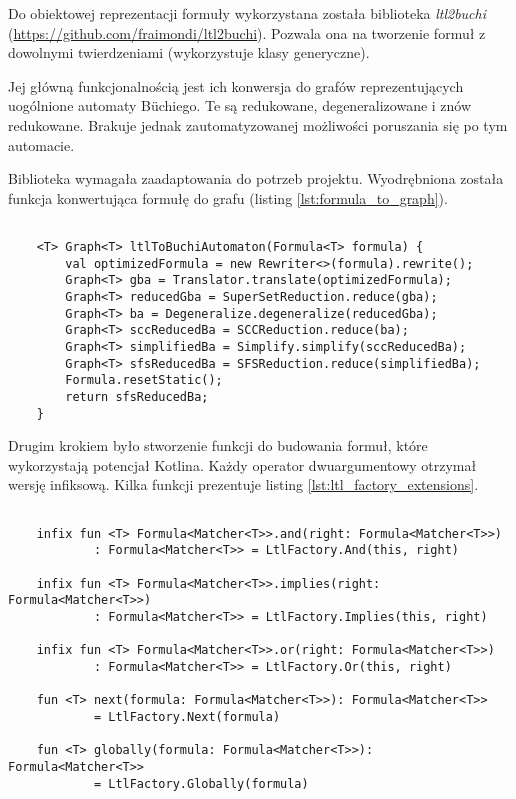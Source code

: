 Do obiektowej reprezentacji formuły wykorzystana została biblioteka \textit{ltl2buchi} \\(\url{https://github.com/fraimondi/ltl2buchi}).
Pozwala ona na tworzenie formuł z dowolnymi twierdzeniami (wykorzystuje klasy generyczne).

Jej główną funkcjonalnością jest ich konwersja do grafów reprezentujących uogólnione automaty Büchiego.
Te są redukowane, degeneralizowane i znów redukowane.
Brakuje jednak zautomatyzowanej możliwości poruszania się po tym automacie.

Biblioteka wymagała zaadaptowania do potrzeb projektu.
Wyodrębniona została funkcja konwertująca formułę do grafu (listing \ref{lst:formula_to_graph}).

\begin{minipage}{\linewidth}
\begin{lstlisting}[caption={Funkcja konwertująca formułę LTL do grafu.},captionpos=b,label={lst:formula_to_graph}]

    <T> Graph<T> ltlToBuchiAutomaton(Formula<T> formula) {
        val optimizedFormula = new Rewriter<>(formula).rewrite();
        Graph<T> gba = Translator.translate(optimizedFormula);
        Graph<T> reducedGba = SuperSetReduction.reduce(gba);
        Graph<T> ba = Degeneralize.degeneralize(reducedGba);
        Graph<T> sccReducedBa = SCCReduction.reduce(ba);
        Graph<T> simplifiedBa = Simplify.simplify(sccReducedBa);
        Graph<T> sfsReducedBa = SFSReduction.reduce(simplifiedBa);
        Formula.resetStatic();
        return sfsReducedBa;
    }

\end{lstlisting}
\end{minipage}

Drugim krokiem było stworzenie funkcji do budowania formuł, które wykorzystają potencjał Kotlina.
Każdy operator dwuargumentowy otrzymał wersję infiksową.
Kilka funkcji prezentuje listing \ref{lst:ltl_factory_extensions}.

\begin{minipage}{\linewidth}
\begin{lstlisting}[caption={Przykładowe funkcje do budowania formuł w języku Kotlin.},captionpos=b,label={lst:ltl_factory_extensions}]

    infix fun <T> Formula<Matcher<T>>.and(right: Formula<Matcher<T>>)
            : Formula<Matcher<T>> = LtlFactory.And(this, right)

    infix fun <T> Formula<Matcher<T>>.implies(right: Formula<Matcher<T>>)
            : Formula<Matcher<T>> = LtlFactory.Implies(this, right)

    infix fun <T> Formula<Matcher<T>>.or(right: Formula<Matcher<T>>)
            : Formula<Matcher<T>> = LtlFactory.Or(this, right)

    fun <T> next(formula: Formula<Matcher<T>>): Formula<Matcher<T>>
            = LtlFactory.Next(formula)

    fun <T> globally(formula: Formula<Matcher<T>>): Formula<Matcher<T>>
            = LtlFactory.Globally(formula)

\end{lstlisting}
\end{minipage}

